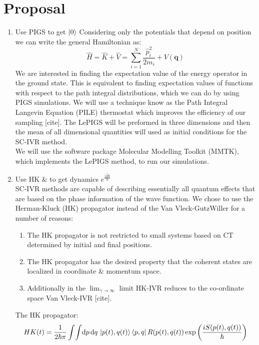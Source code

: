 \documentclass[12pt,letterpaper,oneside,final,titlepage]{article}               %
\numberwithin{equation}{section} %
\newcommand{\eiHt}{e^{\frac{i\hat{H}t}{\hbar}}}
\renewcommand{\vec}[1]{\mathbf{#1}}
\begin{document}
\section{Proposal}
\begin{enumerate}
    \item Use PIGS to get $\ket{0}$
    Considering only the potentials that depend on position we can write the general Hamiltonian as:
    \begin{equation}
        \hat{H} = \hat{K} + \hat{V} = \sum_{i=1}^{N}\frac{\hat{p}_{i}^2}{2m_{i}} + V(\vec{q})
    \end{equation}
    We are interested in finding the expectation value of the energy operator in the ground state. 
    This is equivalent to finding expectation values of functions with respect to the path integral distributions, which we can do by using PIGS simulations.
    We will use a technique know as the Path Integral Langevin Equation (PILE) thermostat which improves the efficiency of our sampling [cite].
    The LePIGS will be preformed in three dimensions and then the mean of all dimensional quantities will used as initial conditions for the SC-IVR method. \\
    We will use the software package Molecular Modelling Toolkit (MMTK), which implements the LePIGS method, to run our simulations.\\


    \item Use HK $\&$ to get dynamics $\eiHt$ \\
    SC-IVR methods are capable of describing essentially all quantum effects that are based on the phase information of the wave function.
    We chose to use the Herman-Kluck (HK) propagator instead of the Van Vleck-GutzWiller for a number of reasons:
    \begin{enumerate}
        \item The HK propagator is not restricted to small systems based on CT determined by initial and final positions.
        \item The HK propagator has the desired property that the coherent states are localized in coordinate $\&$ momentum space.
        \item Additionally in the $\lim_{\gamma \to \infty}$ limit HK-IVR reduces to the co-ordinate space Van Vleck-IVR [cite]. 
    \end{enumerate}
    The HK propagator:
    \begin{equation}
        HK(t) = \frac{1}{2\hbar\pi}\int\!\int \!\dif p\,\!\dif q\, 
        \ket{p(t), q(t)}\bra{p,q} R(p(t),q(t))
        \exp{\left(\frac{iS(p(t),q(t))}{\hbar}\right)}
    \end{equation}


\end{enumerate}
\end{document}
